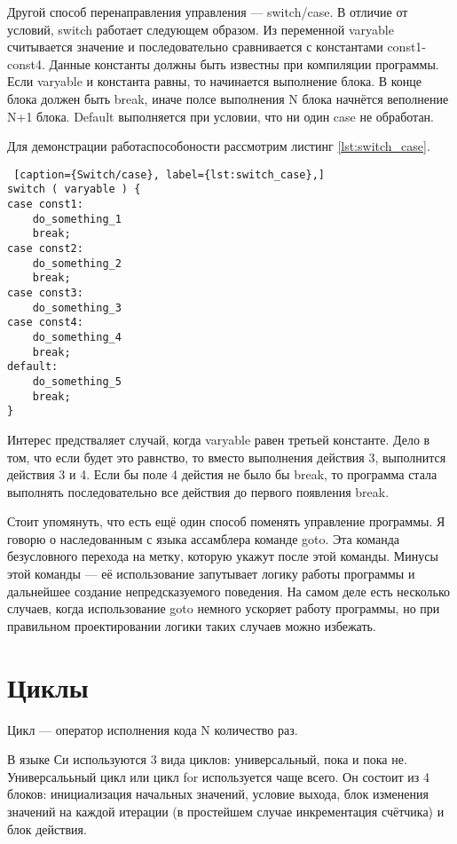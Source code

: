 \documentclass{bmstu}
\begin{document}
Другой способ перенаправления управления --- switch/case.
В отличие от условий, switch работает следующем образом. 
Из переменной varyable считывается значение и последовательно сравнивается с константами const1-const4.
Данные константы должны быть известны при компиляции программы.
Если varyable и константа равны, то начинается выполнение блока.
В конце блока должен быть break, иначе полсе выполнения N блока начнётся веполнение N+1 блока.
Default выполняется при условии, что ни один case не обработан.

Для демонстрации работаспособоности рассмотрим листинг \ref{lst:switch_case}.

\begin{lstlisting} [caption={Switch/case}, label={lst:switch_case},]
switch ( varyable ) {
case const1:
    do_something_1
    break;
case const2:
    do_something_2
    break;
case const3:
    do_something_3
case const4:
    do_something_4
    break;        
default:
    do_something_5
    break;
}
\end{lstlisting}

Интерес предстваляет случай, когда varyable равен третьей константе.
Дело в том, что если будет это равнство, то вместо выполнения действия 3, выполнится действия 3 и 4.
Если бы поле 4 дейстия не было бы break, то программа стала выполнять последовательно все действия до первого появления break.

Стоит упомянуть, что есть ещё один способ поменять управление программы.
Я говорю о наследованным с языка ассамблера команде goto.
Эта команда безусловного перехода на метку, которую укажут после этой команды.
Минусы этой команды --- её использование запутывает логику работы программы и дальнейшее создание непредсказуемого поведения.
На самом деле есть несколько случаев, когда использование goto немного ускоряет работу программы, но при правильном проектировании логики таких случаев можно избежать.

\section{Циклы}

Цикл --- оператор исполнения кода N количество раз.

В языке Си используются 3 вида циклов: универсальный, пока и пока не.
Универсалььный цикл или цикл for используется чаще всего.
Он состоит из 4 блоков: инициализация начальных значений, условие выхода, блок изменения значений на каждой итерации (в простейшем случае инкрементация счётчика) и блок действия.
\end{document}
